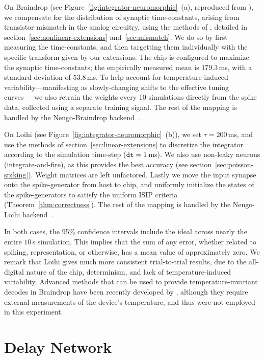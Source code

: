 On Braindrop (see Figure~\ref{fig:integrator-neuromorphic}~(a), reproduced from \citet[][Figure~15]{braindrop2019}), we compensate for the distribution of synaptic time-constants, arising from transistor mismatch in the analog circuitry, using the methods of \citet{voelker2017iscas}, detailed in section~\ref{sec:nonlinear-extensions} and~\ref{sec:mismatch}.
We do so by first measuring the time-constants, and then targetting them individually with the specific transform given by our extensions.
The chip is configured to maximize the synaptic time-constants; the empirically measured mean is $179.3$\,ms, with a standard deviation of $53.8$\,ms.
To help account for temperature-induced variability---manifesting as slowly-changing shifts to the effective tuning curves~\citep{abrams2017}---we also retrain the weights every 10 simulations directly from the spike data, collected using a separate training signal.
The rest of the mapping is handled by the Nengo-Braindrop backend~\citep{neckar2018optimizing, braindrop2019}.

On Loihi (see Figure~\ref{fig:integrator-neuromorphic}~(b)), we set $\tau = 200$\,ms, and use the methods of section~\ref{sec:linear-extensions} to discretize the integrator according to the simulation time-step ($\texttt{dt}{} = 1$\,ms).
We also use non-leaky neurons (integrate-and-fire), as this provides the best accuracy (see section~\ref{sec:poisson-spiking}).
Weight matrices are left unfactored.
Lastly we move the input synapse onto the spike-generator from host to chip, and uniformly initialize the states of the spike-generators to satisfy the uniform ISIP criteria (Theorem~\ref{thm:correctness}).
The rest of the mapping is handled by the Nengo-Loihi backend~\citep{nengoloihi}.

In both cases, the 95\% confidence intervals include the ideal across nearly the entire $10$\,s simulation.
This implies that the sum of any error, whether related to spiking, representation, or otherwise, has a mean value of approximately zero.
We remark that Loihi gives much more consistent trial-to-trial results, due to the all-digital nature of the chip, determinism, and lack of temperature-induced variability.
Advanced methods that can be used to provide temperature-invariant decodes in Braindrop have been recently developed by \citet{reidpint2019}, although they require external measurements of the device's temperature, and thus were not employed in this experiment.

\section{Delay Network}
\label{sec:neuromorphic-dn}

